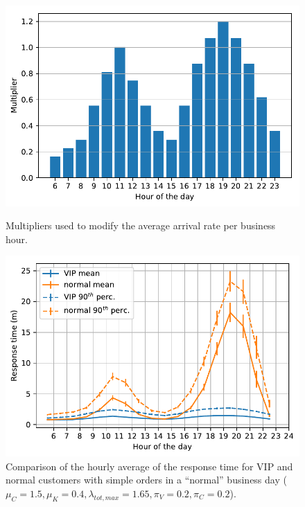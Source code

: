 \begin{figure}
  \begin{minipage}{0.48\textwidth}
    \centering
    \includegraphics[width=\textwidth]{figs/business_day/input_bd.pdf}
    \caption{Multipliers used to modify the average arrival rate per business hour.}
    \label{fig:bd:mul}
  \end{minipage}\hspace{0.03\textwidth}
  \begin{minipage}{0.48\textwidth}
    \centering
    \includegraphics[width=\textwidth]{figs/business_day/vip_vs_normal_simple.pdf}
    \caption{Comparison of the hourly average of the response time for VIP and normal customers with simple orders in a ``normal'' business day ($\mu_C=1.5, \mu_K=0.4, \lambda_{tot,max} = 1.65, \pi_V=0.2, \pi_C=0.2$).}
    \label{fig:bd:vip_vs_norm}
  \end{minipage}
\end{figure}

